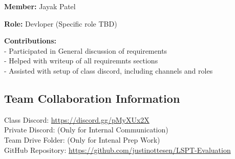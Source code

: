 \textbf{Member:} Jayak Patel

\smallskip

\textbf{Role:} Devloper (Specific role TBD)

\smallskip

\textbf{Contributions:} \\
- Participated in General discussion of requirements \\
- Helped with writeup of all requiremnts sections \\
- Assisted with setup of class discord, including channels and roles

\subsection*{Team Collaboration Information}
Class Discord: \url{https://discord.gg/pMyXUx2X}\\
Private Discord: (Only for Internal Communication) \\
Team Drive Folder: (Only for Intenal Prep Work) \\
GitHub Repository: \url{https://github.com/justinottesen/LSPT-Evaluation}
